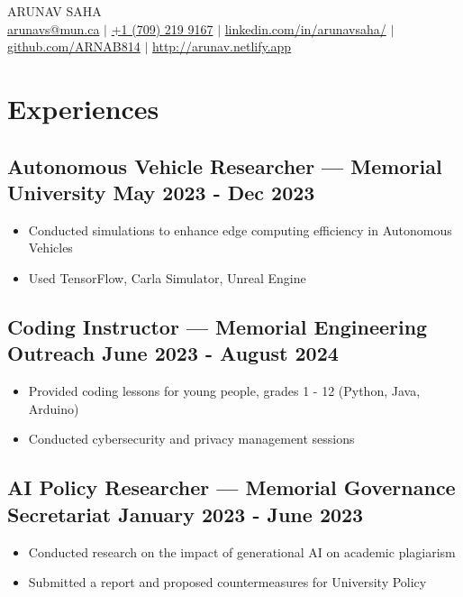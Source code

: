 \documentclass[10pt]{article}
\begin{document}
\begin{center}
    {\fontsize{32}{32}\selectfont\interthin ARUNAV SAHA} \\ \bigskip
    {\color{icnclr}\faEnvelope[regular]} \href{mailto:arunavs@mun.ca}{arunavs@mun.ca} $|$ 
    {\color{icnclr}} \href{tel:+17092199167}{+1 (709) 219 9167} $|$
    {\color{icnclr}\faLinkedinIn} \href{https://www.linkedin.com/in/arunavsaha/}{linkedin.com/in/arunavsaha/} $|$
    {\color{icnclr}\faGithub} \href{https://github.com/ARNAB814}{github.com/ARNAB814} $|$
    {\color{icnclr}\faGlobe} \href{http://arunav.netlify.app}{http://arunav.netlify.app}
\end{center}
\section{Experiences}

\subsection{Autonomous Vehicle Researcher — Memorial University \hfill May 2023 - Dec 2023}
\begin{itemize}
    \item Conducted simulations to enhance edge computing efficiency in Autonomous Vehicles
    \item Used TensorFlow, Carla Simulator, Unreal Engine 
\end{itemize}

\subsection{Coding Instructor — Memorial Engineering Outreach \hfill June 2023 - August 2024}
\begin{itemize}
    \item Provided coding lessons for young people, grades 1 - 12 (Python, Java, Arduino)
    \item Conducted cybersecurity and privacy management sessions
\end{itemize}


\subsection{AI Policy Researcher — Memorial Governance Secretariat \hfill January 2023 - June 2023}
\begin{itemize}
    \item Conducted research on the impact of generational AI on academic plagiarism
    \item Submitted a report and proposed countermeasures for University Policy
\end{itemize}
\end{document}
